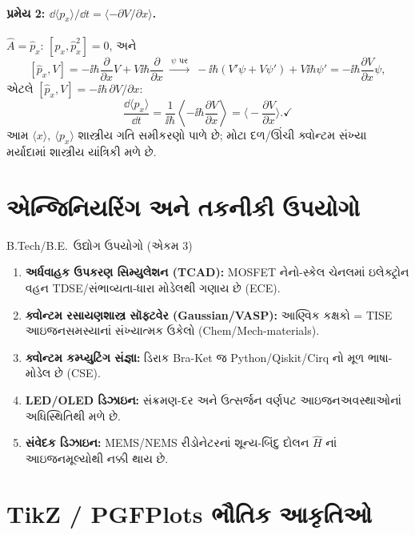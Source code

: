 \paragraph{પ્રમેય 2: $\dd\langle p_x\rangle/\dd t=\langle-\partial V/\partial x\rangle$.}
$\hat A=\hat p_x$: $[\hat p_x,\hat p_x^2]=0$, અને
\[
[\hat p_x,V]=- \ii\hbar\frac{\partial}{\partial x}V+V\ii\hbar\frac{\partial}{\partial x}
\ \xrightarrow{\ \psi\text{ પર}\ }\
-\ii\hbar(V'\psi+V\psi')+V\ii\hbar\psi'=-\ii\hbar\frac{\partial V}{\partial x}\psi ,
\]
એટલે $[\hat p_x,V]=-\ii\hbar\,\partial V/\partial x$:
\[
\frac{\dd\langle p_x\rangle}{\dd t}=\frac{1}{\ii\hbar}\left\langle-\ii\hbar\frac{\partial V}{\partial x}\right\rangle
=\Big\langle-\frac{\partial V}{\partial x}\Big\rangle . \checkmark
\]
આમ $\langle x\rangle,\ \langle p_x\rangle$ શાસ્ત્રીય ગતિ સમીકરણો પાળે છે; મોટા દળ/ઊંચી ક્વોન્ટમ સંખ્યા મર્યાદામાં શાસ્ત્રીય યાંત્રિકી મળે છે.

\section{એન્જિનિયરિંગ અને તકનીકી ઉપયોગો}
\begin{upayogbox}{B.Tech/B.E.\ ઉદ્યોગ ઉપયોગો (એકમ 3)}
\begin{enumerate}[label=\textbullet]
  \item \textbf{અર્ધવાહક ઉપકરણ સિમ્યુલેશન (TCAD):} MOSFET નેનો-સ્કેલ ચેનલમાં ઇલેક્ટ્રોન વહન TDSE/સંભાવ્યતા-ધારા મોડેલથી ગણાય છે (ECE).
  \item \textbf{ક્વોન્ટમ રસાયણશાસ્ત્ર સૉફ્ટવેર (Gaussian/VASP):} આણ્વિક કક્ષકો = TISE આઇજનસમસ્યાનાં સંખ્યાત્મક ઉકેલો (Chem/Mech-materials).
  \item \textbf{ક્વોન્ટમ કમ્પ્યુટિંગ સંજ્ઞા:} ડિરાક Bra-Ket જ Python/Qiskit/Cirq નો મૂળ ભાષા-મોડેલ છે (CSE).
  \item \textbf{LED/OLED ડિઝાઇન:} સંક્રમણ-દર અને ઉત્સર્જન વર્ણપટ આઇજનઅવસ્થાઓનાં અધિસ્થિતિથી મળે છે.
  \item \textbf{સંવેદક ડિઝાઇન:} MEMS/NEMS રીડોનેટરનાં શૂન્ય-બિંદુ દોલન $\hat H$ નાં આઇજનમૂલ્યોથી નક્કી થાય છે.
\end{enumerate}
\end{upayogbox}

\section{TikZ / PGFPlots ભૌતિક આકૃતિઓ}

